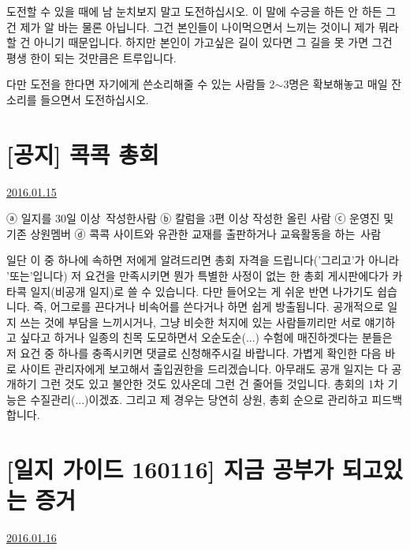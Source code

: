 도전할 수 있을 때에 남 눈치보지 말고 도전하십시오.
이 말에 수긍을 하든 안 하든 그건 제가 알 바는 물론 아닙니다.
그건 본인들이 나이먹으면서 느끼는 것이니 제가 뭐라할 건 아니기 때문입니다.
하지만 본인이 가고싶은 길이 있다면 그 길을 못 가면 그건 평생 한이 되는 것만큼은 트루입니다.
\vspace{5mm}

다만 도전을 한다면 자기에게 쓴소리해줄 수 있는 사람들 2$\sim$3명은 확보해놓고 매일 잔소리를 들으면서 도전하십시오.
\vspace{5mm}






\section{[공지] 콕콕 총회}
\href{https://www.kockoc.com/Apoc/589984}{2016.01.15}

\vspace{5mm}

ⓐ 일지를 30일 이상 작성한사람
ⓑ 칼럼을 3편 이상 작성한 올린 사람
ⓒ 운영진 및 기존 상원멤버
ⓓ 콕콕 사이트와 유관한 교재를 출판하거나 교육활동을 하는 사람
\vspace{5mm}

일단 이 중 하나에 속하면 저에게 알려드리면 총회 자격을 드립니다('그리고'가 아니라 '또는'입니다)
저 요건을 만족시키면 뭔가 특별한 사정이 없는 한 총회 게시판에다가 카타콕 일지(비공개 일지)로 쓸 수 있습니다.
다만 들어오는 게 쉬운 반면 나가기도 쉽습니다. 즉, 어그로를 끈다거나 비속어를 쓴다거나 하면 쉽게 방출됩니다.
공개적으로 일지 쓰는 것에 부담을 느끼시거나, 그냥 비슷한 처지에 있는 사람들끼리만 서로 얘기하고 싶다고 하거나
일종의 친목 도모하면서 오순도순(...) 수험에 매진하겟다는 분들은 저 요건 중 하나를 충족시키면 댓글로 신청해주시길 바랍니다.
가볍게 확인한 다음 바로 사이트 관리자에게 보고해서 출입권한을 드리겠습니다.
아무래도 공개 일지는 다 공개하기 그런 것도 있고 불안한 것도 있사온데 그런 건 줄어들 것입니다.
총회의 1차 기능은 수질관리(...)이겠죠. 그리고 제 경우는 당연히 상원, 총회 순으로 관리하고 피드백합니다.
\vspace{5mm}






\section{[일지 가이드 160116] 지금 공부가 되고있는 증거}
\href{https://www.kockoc.com/Apoc/590446}{2016.01.16}

